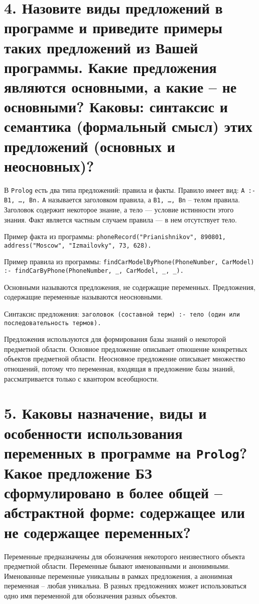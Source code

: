 \section*{4. Назовите виды предложений в программе и приведите примеры таких предложений из Вашей программы. Какие предложения являются основными, а какие – не основными?  Каковы: синтаксис и семантика (формальный смысл) этих предложений (основных и неосновных)?}

В \texttt{Prolog} есть два типа предложений: правила и факты. Правило имеет вид: \texttt{A :- B1, \ldots, Bn.} 
\texttt{A} называется заголовком правила, а \texttt{B1, \ldots, Bn} – телом правила. Заголовок содержит некоторое знание, а тело --- условие истинности этого знания. Факт является частным случаем правила --- в нем отсутствует тело.

Пример факта из программы: \texttt{phoneRecord("Prianishnikov", 890801, address("Moscow", "Izmailovky", 73, 628).}


Пример правила из программы: \texttt{findCarModelByPhone(PhoneNumber, CarModel) :- findCarByPhone(PhoneNumber, \_, CarModel, \_, \_).}

Основными называются предложения, не содержащие переменных. Предложения, содержащие переменные называются неосновными. 

Синтаксис предложения: \texttt{заголовок (составной терм) :- тело (один или последовательность термов).} 

Предложения используются для формирования базы знаний о некоторой предметной области. Основное предложение описывает отношение конкретных объектов предметной области. Неосновное предложение описывает множество отношений, потому что переменная, входящая в предложение базы знаний, рассматривается только с квантором всеобщности.

\section*{5. Каковы назначение, виды и особенности использования переменных в программе на \texttt{Prolog}? Какое предложение БЗ сформулировано в более общей – абстрактной форме: содержащее или не содержащее переменных?}

Переменные предназначены для обозначения некоторого неизвестного объекта предметной области. Переменные бывают именованными и анонимными. Именованные переменные уникальны в рамках предложения, а анонимная переменная – любая уникальна. В разных предложениях может использоваться одно имя переменной для обозначения разных объектов.


